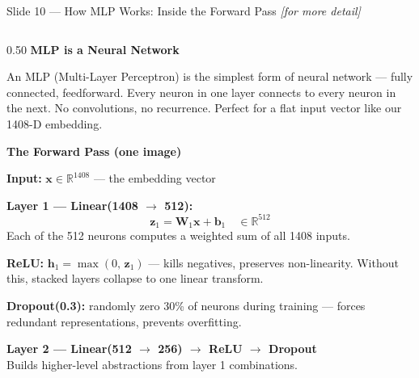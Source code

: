 \documentclass[aspectratio=169, 9pt]{beamer}
\begin{document}
\begin{frame}{Slide 10 --- How MLP Works: Inside the Forward Pass \hfill{\small\textit{[for more detail]}}}

  \begin{columns}[T]

    \begin{column}{0.50\textwidth}
      \textbf{\color{navyblue}MLP is a Neural Network}

      \vspace{0.2em}
      {\scriptsize
      An MLP (Multi-Layer Perceptron) is the simplest form of neural network
      --- fully connected, feedforward. Every neuron in one layer connects to
      every neuron in the next. No convolutions, no recurrence. Perfect for
      a flat input vector like our 1408-D embedding.
      }

      \vspace{0.3em}
      \textbf{\color{navyblue}The Forward Pass (one image)}

      \vspace{0.2em}
      {\scriptsize
      \textbf{Input:} $\mathbf{x} \in \mathbb{R}^{1408}$ --- the embedding vector

      \vspace{0.2em}
      \textbf{Layer 1 --- Linear(1408 $\to$ 512):}
      \[ \mathbf{z}_1 = \mathbf{W}_1 \mathbf{x} + \mathbf{b}_1 \quad \in \mathbb{R}^{512} \]
      Each of the 512 neurons computes a weighted sum of all 1408 inputs.

      \vspace{0.1em}
      \textbf{ReLU:} $\mathbf{h}_1 = \max(0,\, \mathbf{z}_1)$
      --- kills negatives, preserves non-linearity.
      Without this, stacked layers collapse to one linear transform.

      \vspace{0.1em}
      \textbf{Dropout(0.3):} randomly zero 30\% of neurons during training
      --- forces redundant representations, prevents overfitting.

      \vspace{0.2em}
      \textbf{Layer 2 --- Linear(512 $\to$ 256) $\to$ ReLU $\to$ Dropout}\\
      Builds higher-level abstractions from layer 1 combinations.

}
\end{column}
\end{columns}
\end{frame}
\end{document}
